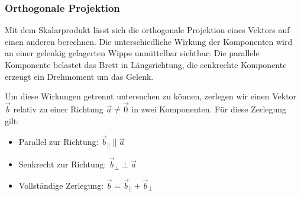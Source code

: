 \subsubsection{Orthogonale Projektion}
\label{subsubsec:vector_algebra_orthogonal_projection}

Mit dem Skalarprodukt lässt sich die orthogonale Projektion
 eines Vektors auf einen anderen
berechnen. Die unterschiedliche Wirkung der Komponenten wird an einer
gelenkig gelagerten Wippe unmittelbar sichtbar: Die parallele Komponente
 belastet das Brett in Längsrichtung, die
senkrechte Komponente  erzeugt ein
Drehmoment um das Gelenk.

\begin{center}
\end{center}

Um diese Wirkungen getrennt untersuchen zu können, zerlegen wir einen Vektor
$\vec b$ relativ zu einer Richtung $\vec a\ne\vec 0$ in zwei Komponenten. Für diese Zerlegung gilt:
\par\medskip
\noindent
\begin{minipage}[c]{0.45\linewidth}
  \begin{itemize}[leftmargin=1.4em,itemsep=0.8em]
    \item Parallel zur Richtung:\quad
      $\vec b_{\parallel}\parallel\vec a$
    \item Senkrecht zur Richtung:\quad
      $\vec b_{\perp}\perp\vec a$
    \item Vollständige Zerlegung:\quad
      $\vec b=\vec b_{\parallel}+\vec b_{\perp}$
  \end{itemize}
\end{minipage}\hfill
\begin{minipage}[c]{0.52\linewidth}
  \centering
\end{minipage}
\par\medskip

